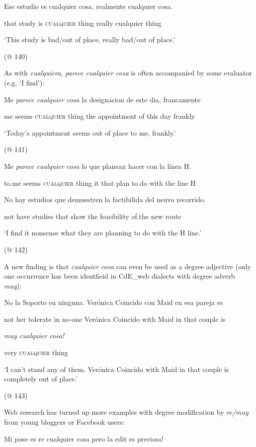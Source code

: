 \documentclass[output=paper]{langscibook}
\begin{document}
    Ese  estudio  es  cualquier  cosa,  realmente  cualquier  cosa.

    that  study  is  \textsc{cualquier}  thing  really  cualquier  thing

    ‘This study is bad/out of place, really bad/out of place.’

    (@ 140)

As with \textit{cualquiera}, \textit{parece cualquier cosa} is often accompanied by some evaluator (e.g. ‘I find’):

    Me  \textit{parece  cualquier  cosa} la  designacion  de  este  dia,  francamente

    me  seems  \textsc{cualquier}  thing  the  appointment  of  this  day  frankly

    ‘Today’s appointment seems out of place to me, frankly.’

    (@ 141)

    Me  \textit{parece  cualquier  cosa} lo  que  planean  hacer  con  la  línea H.

    to.me  seems  \textsc{cualquier}  thing  it  that  plan  to.do  with  the  line H

    No  hay  estudios  que  demuestren  la  factibilida  del  neuvo  recorrido.

    not  have  studies  that  show  the  feasibility  of.the  new  route

    ‘I find it nonsense what they are planning to do with the H line.’

    (@ 142)

A new finding is that \textit{cualquier cosa} can even be used as a degree adjective (only one occurrence has been identfieid in CdE\_web dialects with degree adverb \textit{muy}):

    No  la  Soporto  en  ninguna.  Verónica  Coincido  con  Maid  en  esa  pareja  es

    not  her  tolerate  in  no-one  Verónica  Coincido  with  Maid  in  that  couple  is

    \textit{muy  cualquier  cosa!} 

    very  \textsc{cualquier}  thing  

    ‘I can’t stand any of them. Verónica Coincido with Maid in that couple is completely out of place.’

    (@ 143) 

Web research has turned up more examples with degree modification by \textit{re/muy} from young bloggers or Facebook users:

    Mi  pose  es  re  cualquier  cosa  pero  la  edit  es  preciosa!
\end{document}
